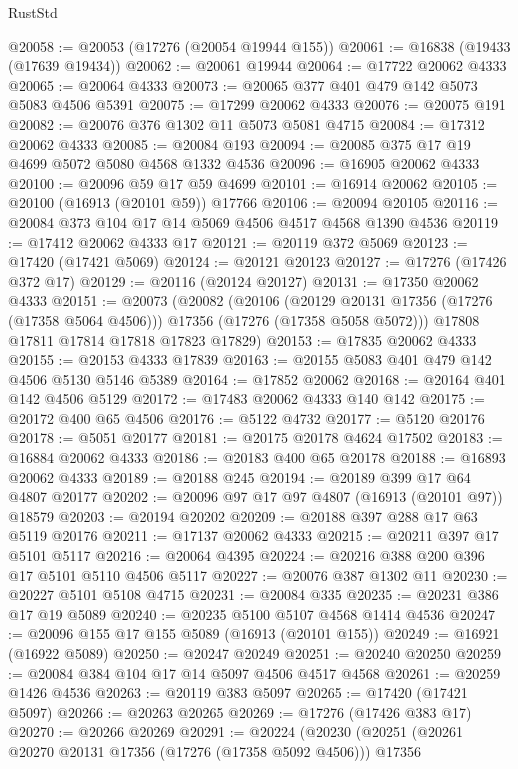 \begin{lexlean}{RustStd}
\begin{coremodule}
@20058 := @20053 (@17276 (@20054 @19944 @155))
@20061 := @16838 (@19433 (@17639 @19434))
@20062 := @20061 @19944
@20064 := @17722 @20062 @4333
@20065 := @20064 @4333
@20073 := @20065 @377 @401 @479 @142 @5073 @5083 @4506 @5391
@20075 := @17299 @20062 @4333
@20076 := @20075 @191
@20082 := @20076 @376 @1302 @11 @5073 @5081 @4715
@20084 := @17312 @20062 @4333
@20085 := @20084 @193
@20094 := @20085 @375 @17 @19 @4699 @5072 @5080 @4568 @1332 @4536
@20096 := @16905 @20062 @4333
@20100 := @20096 @59 @17 @59 @4699
@20101 := @16914 @20062
@20105 := @20100 (@16913 (@20101 @59)) @17766
@20106 := @20094 @20105
@20116 := @20084 @373 @104 @17 @14 @5069 @4506 @4517 @4568 @1390 @4536
@20119 := @17412 @20062 @4333 @17
@20121 := @20119 @372 @5069
@20123 := @17420 (@17421 @5069)
@20124 := @20121 @20123
@20127 := @17276 (@17426 @372 @17)
@20129 := @20116 (@20124 @20127)
@20131 := @17350 @20062 @4333
@20151 := @20073
    (@20082
      (@20106
        (@20129 @20131 @17356 (@17276 (@17358 @5064 @4506)))
        @17356
        (@17276 (@17358 @5058 @5072)))
      @17808
      @17811
      @17814
      @17818
      @17823
      @17829)
@20153 := @17835 @20062 @4333
@20155 := @20153 @4333 @17839
@20163 := @20155 @5083 @401 @479 @142 @4506 @5130 @5146 @5389
@20164 := @17852 @20062
@20168 := @20164 @401 @142 @4506 @5129
@20172 := @17483 @20062 @4333 @140 @142
@20175 := @20172 @400 @65 @4506
@20176 := @5122 @4732
@20177 := @5120 @20176
@20178 := @5051 @20177
@20181 := @20175 @20178 @4624 @17502
@20183 := @16884 @20062 @4333
@20186 := @20183 @400 @65 @20178
@20188 := @16893 @20062 @4333
@20189 := @20188 @245
@20194 := @20189 @399 @17 @64 @4807 @20177
@20202 := @20096 @97 @17 @97 @4807 (@16913 (@20101 @97)) @18579
@20203 := @20194 @20202
@20209 := @20188 @397 @288 @17 @63 @5119 @20176
@20211 := @17137 @20062 @4333
@20215 := @20211 @397 @17 @5101 @5117
@20216 := @20064 @4395
@20224 := @20216 @388 @200 @396 @17 @5101 @5110 @4506 @5117
@20227 := @20076 @387 @1302 @11
@20230 := @20227 @5101 @5108 @4715
@20231 := @20084 @335
@20235 := @20231 @386 @17 @19 @5089
@20240 := @20235 @5100 @5107 @4568 @1414 @4536
@20247 := @20096 @155 @17 @155 @5089 (@16913 (@20101 @155))
@20249 := @16921 (@16922 @5089)
@20250 := @20247 @20249
@20251 := @20240 @20250
@20259 := @20084 @384 @104 @17 @14 @5097 @4506 @4517 @4568
@20261 := @20259 @1426 @4536
@20263 := @20119 @383 @5097
@20265 := @17420 (@17421 @5097)
@20266 := @20263 @20265
@20269 := @17276 (@17426 @383 @17)
@20270 := @20266 @20269
@20291 := @20224
    (@20230
      (@20251
        (@20261 @20270 @20131 @17356 (@17276 (@17358 @5092 @4506)))
        @17356

\end{coremodule}
\end{lexlean}
